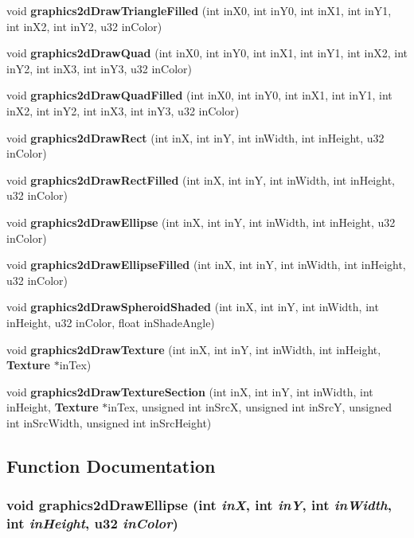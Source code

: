 \begin{CompactItemize}
void {\bf graphics2d\-Draw\-Triangle\-Filled} (int in\-X0, int in\-Y0, int in\-X1, int in\-Y1, int in\-X2, int in\-Y2, u32 in\-Color)
\item 
void {\bf graphics2d\-Draw\-Quad} (int in\-X0, int in\-Y0, int in\-X1, int in\-Y1, int in\-X2, int in\-Y2, int in\-X3, int in\-Y3, u32 in\-Color)
\item 
void {\bf graphics2d\-Draw\-Quad\-Filled} (int in\-X0, int in\-Y0, int in\-X1, int in\-Y1, int in\-X2, int in\-Y2, int in\-X3, int in\-Y3, u32 in\-Color)
\item 
void {\bf graphics2d\-Draw\-Rect} (int in\-X, int in\-Y, int in\-Width, int in\-Height, u32 in\-Color)
\item 
void {\bf graphics2d\-Draw\-Rect\-Filled} (int in\-X, int in\-Y, int in\-Width, int in\-Height, u32 in\-Color)
\item 
void {\bf graphics2d\-Draw\-Ellipse} (int in\-X, int in\-Y, int in\-Width, int in\-Height, u32 in\-Color)
\item 
void {\bf graphics2d\-Draw\-Ellipse\-Filled} (int in\-X, int in\-Y, int in\-Width, int in\-Height, u32 in\-Color)
\item 
void {\bf graphics2d\-Draw\-Spheroid\-Shaded} (int in\-X, int in\-Y, int in\-Width, int in\-Height, u32 in\-Color, float in\-Shade\-Angle)
\item 
void {\bf graphics2d\-Draw\-Texture} (int in\-X, int in\-Y, int in\-Width, int in\-Height, {\bf Texture} $\ast$in\-Tex)
\item 
void {\bf graphics2d\-Draw\-Texture\-Section} (int in\-X, int in\-Y, int in\-Width, int in\-Height, {\bf Texture} $\ast$in\-Tex, unsigned int in\-Src\-X, unsigned int in\-Src\-Y, unsigned int in\-Src\-Width, unsigned int in\-Src\-Height)
\end{CompactItemize}


\subsection{Function Documentation}
\subsubsection{\setlength{\rightskip}{0pt plus 5cm}void graphics2d\-Draw\-Ellipse (int {\em in\-X}, int {\em in\-Y}, int {\em in\-Width}, int {\em in\-Height}, u32 {\em in\-Color})}\label{flGraphics2d_8c_1801c42fc90be61982c4fb7a77f0c44a}




